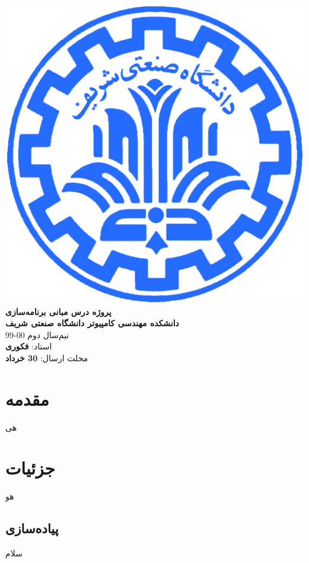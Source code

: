 \documentclass{article}
\begin{document}
    \begin{titlepage}
        \begin{center}
            \includegraphics{./Resources/sharif-large.png} \\
            \vspace{0.5cm}
            \Huge\textbf{پروژه درس مبانی برنامه‌سازی} \\
            \vspace{1cm}
            \Large\textbf{دانشکده مهندسی کامپیوتر دانشگاه صنعتی شریف} \\
            \vspace{1cm}
            \large نیم‌سال دوم 00-99\\
            \vspace{1cm}
            \Large استاد: \textbf{فکوری} \\
            \vspace{1cm}
            \Large محلت ارسال: \textbf{30 خرداد}
        \end{center}
    \end{titlepage}

    \thispagestyle{empty}
    \tableofcontents
    \newpage
    \clearpage
    \setcounter{page}{1}

    \section{مقدمه}
    هی

    \section{جزئیات}
    هو
    \subsection{پیاده‌سازی}
    سلام
\end{document}
